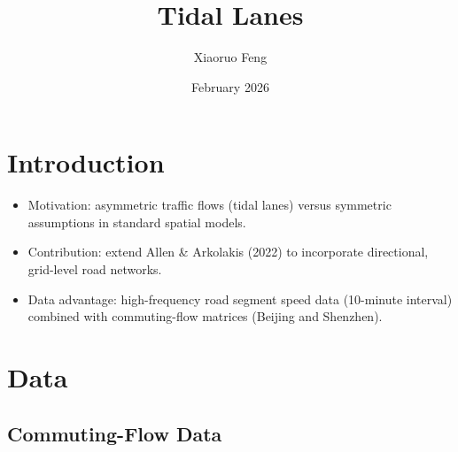 \documentclass[12pt]{article}
\title{Tidal Lanes}
\author{Xiaoruo Feng}
\date{February 2026}
\begin{document}
	\maketitle
	
	\section{Introduction}
	\begin{itemize}
		\item Motivation: asymmetric traffic flows (tidal lanes) versus symmetric assumptions in standard spatial models.
		\item Contribution: extend Allen \& Arkolakis (2022) to incorporate directional, grid-level road networks.
		\item Data advantage: high-frequency road segment speed data (10-minute interval) combined with commuting-flow matrices (Beijing and Shenzhen).
	\end{itemize}
	
	\section{Data}
	\subsection{Commuting-Flow Data}
	
\end{document}

